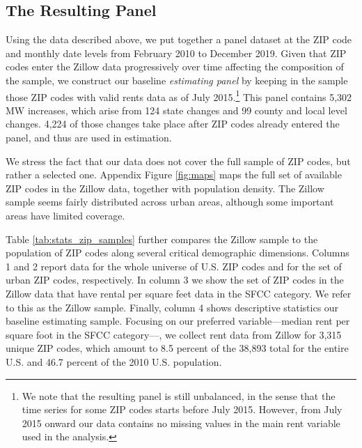 
\subsection{The Resulting Panel}\label{sec:data_final_panel}

Using the data described above, we put together a panel dataset at the ZIP code and monthly 
date levels from February 2010 to December 2019. Given that ZIP codes enter the Zillow data 
progressively over time affecting the composition of the sample, we construct our baseline 
\textit{estimating panel} by keeping in the sample those ZIP codes with valid rents data as 
of July 2015.\footnote{We note that the resulting panel is still unbalanced, in the sense 
	that the time series for some ZIP codes starts before July 2015. However, from July
	2015 onward our data contains no missing values in the main rent variable used in the 
	analysis.} 
This panel contains 5,302 MW increases, which arise from 124 state changes and 99 county 
and local level changes. 4,224 of those changes take place after ZIP codes already entered
the panel, and thus are used in estimation.

We stress the fact that our data does not cover the full sample of ZIP codes, but rather 
a selected one. Appendix Figure \ref{fig:maps} maps the full set of available ZIP codes in 
the Zillow data, together with population density. The Zillow sample seems fairly 
distributed across urban areas, although some important areas have limited coverage. 


Table \ref{tab:stats_zip_samples} further compares the Zillow sample to the 
population of ZIP codes along several critical demographic dimensions. Columns 1 
and 2 report data for the whole universe of U.S. ZIP codes and for the set of urban ZIP 
codes, respectively. In column 3 we show the set of ZIP codes in the Zillow data that have 
rental per square feet data in the SFCC category. We refer to this as the Zillow sample. 
Finally, column 4 shows descriptive statistics our baseline estimating sample. Focusing on 
our preferred variable---median rent per square foot in the SFCC category---, we collect rent 
data from Zillow for 3,315 unique ZIP codes, which amount to 8.5 percent of the 38,893 total 
for the entire U.S. and 46.7 percent of the 2010 U.S. population. 

